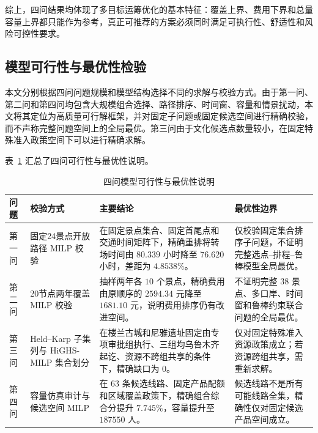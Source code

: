 \documentclass[UTF8,zihao=-4,a4paper]{ctexart}
\begin{document}
综上，四问结果均体现了多目标运筹优化的基本特征：覆盖上界、费用下界和总量容量上界都只能作为参考，真正可推荐的方案必须同时满足可执行性、舒适性和风险可控性要求。

\subsection{模型可行性与最优性检验}
\label{subsec:feasibility_optimality}

本文分别根据四问问题规模和模型结构选择不同的求解与校验方式。由于第一问、第二问和第四问均包含大规模组合选择、路径排序、时间窗、容量和情景扰动，本文将其定位为高质量可行解框架，并对固定子问题或固定候选空间进行精确校验，而不声称完整问题空间上的全局最优。第三问由于文化候选点数量较小，在固定特殊准入政策空间下可以进行精确求解。

表~\ref{tab:model_validity_audit} 汇总了四问可行性与最优性说明。

\begin{table}[htbp]
    \centering
    \caption{四问模型可行性与最优性说明}
    \label{tab:model_validity_audit}
    \small
    \renewcommand{\arraystretch}{1.20}
    \setlength{\tabcolsep}{4pt}
    \begin{tabularx}{\textwidth}{
        >{\centering\arraybackslash}p{1.4cm}
        p{3.2cm}
        X
        p{3.4cm}
    }
        \toprule
        问题 & 校验方式 & 主要结论 & 最优性边界 \\
        \midrule
        第一问
        & 固定24景点开放路径 MILP 校验
        & 在固定景点集合、固定首尾点和交通时间矩阵下，精确重排将转场时间由 $80.339$ 小时降至 $76.620$ 小时，差距为 $4.8538\%$。
        & 仅校验固定集合排序子问题，不证明完整选点--排程--鲁棒模型全局最优。 \\

        第二问
        & 20节点两年覆盖 MILP 校验
        & 抽样两年各 $10$ 个景点，精确费用由原顺序的 $2594.34$ 元降至 $1681.10$ 元，说明费用排序仍有改进空间。
        & 不证明完整 $38$ 景点、多口岸、时间窗和鲁棒约束联合问题的全局最优。 \\

        第三问
        & Held--Karp 子集列与 HiGHS-MILP 集合划分
        & 在楼兰古城和尼雅遗址固定由专项审批组执行、三组均乌鲁木齐起讫、资源不跨组共享的条件下，精确缺口为 $0$。
        & 仅对固定特殊准入资源政策成立；若资源跨组共享，需重新求解。 \\

        第四问
        & 容量仿真审计与候选空间 MILP
        & 在 $63$ 条候选线路、固定产品配额和区域覆盖政策下，精确组合综合分提升 $7.745\%$，容量提升至 $187550$ 人。
        & 候选线路不是所有可能线路全集，精确性仅对固定候选产品空间成立。 \\
        \bottomrule
    \end{tabularx}
\end{table}
\end{document}
